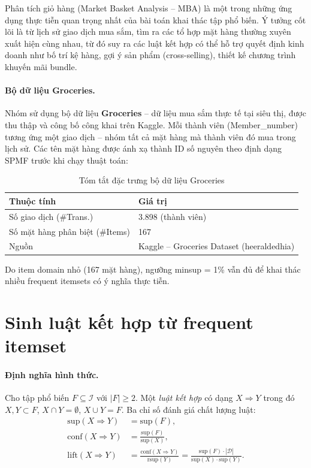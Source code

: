 \documentclass[12pt,a4paper]{report}
\begin{document}
Phân tích giỏ hàng (Market Basket Analysis -- MBA) là một trong những ứng dụng thực
tiễn quan trọng nhất của bài toán khai thác tập phổ biến. Ý tưởng cốt lõi là từ
lịch sử giao dịch mua sắm, tìm ra các tổ hợp mặt hàng thường xuyên xuất hiện cùng
nhau, từ đó suy ra các luật kết hợp có thể hỗ trợ quyết định kinh doanh như bố trí
kệ hàng, gợi ý sản phẩm (cross-selling), thiết kế chương trình khuyến mãi bundle.

\paragraph{Bộ dữ liệu Groceries.}
Nhóm sử dụng bộ dữ liệu \textbf{Groceries} -- dữ liệu mua sắm thực tế tại siêu thị,
được thu thập và công bố công khai trên Kaggle. Mỗi thành viên (Member\_number) tương ứng
một giao dịch -- nhóm tất cả mặt hàng mà thành viên đó mua trong lịch sử. Các tên mặt
hàng được ánh xạ thành ID số nguyên theo định dạng SPMF trước khi chạy thuật toán:

\begin{table}[H]
    \centering
    \caption{Tóm tắt đặc trưng bộ dữ liệu Groceries}
    \label{tab:groceries-info}
    \begin{tabular}{ll}
    \toprule
    \textbf{Thuộc tính} & \textbf{Giá trị} \\
    \midrule
    Số giao dịch (\#Trans.)          & 3.898 (thành viên) \\
    Số mặt hàng phân biệt (\#Items)  & 167 \\
    Nguồn & Kaggle -- Groceries Dataset (heeraldedhia) \\
    \bottomrule
    \end{tabular}
\end{table}

Do item domain nhỏ (167 mặt hàng), ngưỡng minsup = 1\% vẫn đủ để khai thác
nhiều frequent itemsets có ý nghĩa thực tiễn.

\section{Sinh luật kết hợp từ frequent itemset}

\paragraph{Định nghĩa hình thức.}
Cho tập phổ biến $F \subseteq \mathcal{I}$ với $|F| \geq 2$. Một \textit{luật kết
hợp} có dạng $X \Rightarrow Y$ trong đó $X, Y \subset F$, $X \cap Y = \emptyset$,
$X \cup Y = F$. Ba chỉ số đánh giá chất lượng luật:
\begin{align}
    \mathrm{sup}(X \Rightarrow Y) &= \mathrm{sup}(F), \label{eq:rule-sup} \\
    \mathrm{conf}(X \Rightarrow Y) &= \frac{\mathrm{sup}(F)}{\mathrm{sup}(X)}, \label{eq:conf} \\
    \mathrm{lift}(X \Rightarrow Y) &= \frac{\mathrm{conf}(X \Rightarrow Y)}{\mathrm{rsup}(Y)} = \frac{\mathrm{sup}(F) \cdot |\mathcal{D}|}{\mathrm{sup}(X) \cdot \mathrm{sup}(Y)}. \label{eq:lift}
\end{align}
\end{document}
